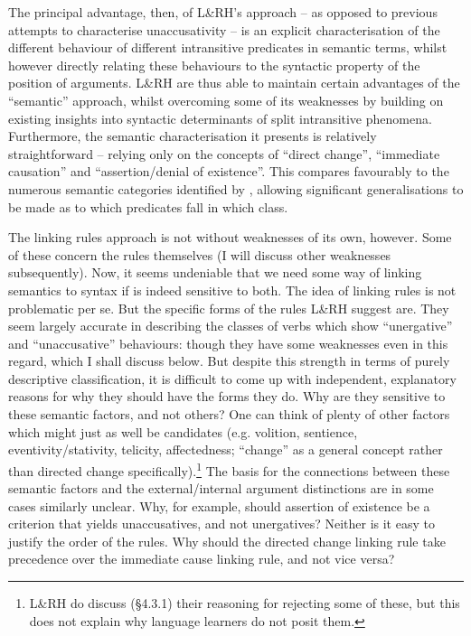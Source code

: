 \documentclass[output=paper]{langsci/langscibook}
\begin{document}
The principal advantage, then, of L\&RH’s approach – as opposed to previous
attempts to characterise unaccusativity – is an explicit characterisation of
the different behaviour of different intransitive predicates in semantic terms,
whilst however directly relating these behaviours to the syntactic property of
the position of arguments. L\&RH are thus able to maintain certain advantages
of the \enquote{semantic} approach, whilst overcoming some of its weaknesses by
building on existing insights into syntactic determinants of split intransitive
phenomena. Furthermore, the semantic characterisation it presents is relatively
straightforward – relying only on the concepts of \enquote{direct change},
\enquote{immediate causation} and \enquote{assertion\slash denial of existence}. This
compares favourably to the numerous semantic categories identified by
\citet{Perlmutter1978}, allowing significant generalisations to be made as to
which predicates fall in which class.

The linking rules approach is not without weaknesses of its own, however. Some
of these concern the rules themselves (I will discuss other weaknesses
subsequently). Now, it seems undeniable that we need some way of linking
semantics to syntax if  is indeed sensitive to both. The
idea of linking rules is not problematic per se. But the specific forms of the
rules L\&RH suggest are.  They seem largely accurate in describing the classes
of verbs which show \enquote{unergative} and \enquote{unaccusative} behaviours:
though they have some weaknesses even in this regard, which I shall discuss
below. But despite this strength in terms of purely descriptive classification,
it is difficult to come up with independent, explanatory reasons for why they
should have the forms they do. Why are they sensitive to these semantic
factors, and not others? One can think of plenty of other factors which might
just as well be candidates (e.g. volition, sentience, eventivity/stativity,
telicity, affectedness; \enquote{change} as a general concept rather than
directed change specifically).\footnote{L\&RH do discuss (§4.3.1) their
reasoning for rejecting some of these, but this does not explain why language
learners do not posit them.}  The basis for the connections between these
semantic factors and the external/internal argument distinctions are in some
cases similarly unclear. Why, for example, should assertion of existence be a
criterion that yields unaccusatives, and not unergatives? Neither is it easy to
justify the order of the rules. Why should the directed change linking rule
take precedence over the immediate cause linking rule, and not vice versa?
\end{document}

